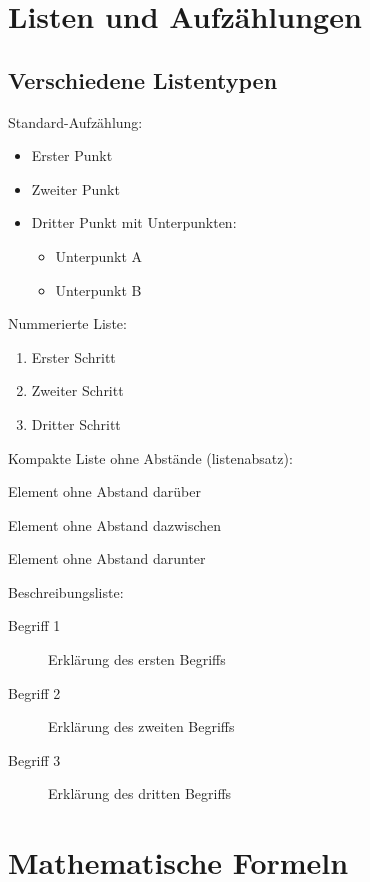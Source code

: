 \section{Listen und Aufzählungen}
\label{sec:listen_demo}

\subsection{Verschiedene Listentypen}
\label{subsec:listentypen}

Standard-Aufzählung:
\begin{itemize}
	\item Erster Punkt
	\item Zweiter Punkt
	\item Dritter Punkt mit Unterpunkten:
	      \begin{itemize}
		      \item Unterpunkt A
		      \item Unterpunkt B
	      \end{itemize}
\end{itemize}

Nummerierte Liste:
\begin{enumerate}
	\item Erster Schritt
	\item Zweiter Schritt
	\item Dritter Schritt
\end{enumerate}

Kompakte Liste ohne Abstände (listenabsatz):
\begin{listenabsatz}
	\item Element ohne Abstand darüber
	\item Element ohne Abstand dazwischen
	\item Element ohne Abstand darunter
\end{listenabsatz}

Beschreibungsliste:
\begin{description}
	\item[Begriff 1] Erklärung des ersten Begriffs
	\item[Begriff 2] Erklärung des zweiten Begriffs
	\item[Begriff 3] Erklärung des dritten Begriffs
\end{description}

\section{Mathematische Formeln}
\label{sec:formeln_demo}


